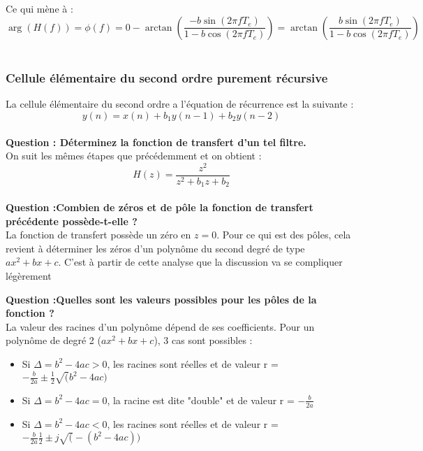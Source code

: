 \documentclass[11pt,a4paper]{article}
\begin{document}
Ce qui mène à :\\

\[ \arg(H(f)) = \phi(f) = 0 - \arctan(\frac{-b \sin(2 \pi f T_e)}{1-b \cos(2 \pi f T_e)}) = \arctan(\frac{b \sin(2 \pi f T_e)}{1-b \cos(2 \pi f T_e)})\]\\

\subsubsection{Cellule élémentaire du second ordre purement récursive}
La cellule élémentaire du second ordre a l'équation de récurrence est la suivante :\\

\[ y(n) =  x(n) + b_1 y(n-1) +b_2 y(n-2)\]\\

\textbf{ Question : Déterminez la fonction de transfert d'un tel filtre.}\\

On suit les mêmes étapes que précédemment et on obtient : \\

\[ H(z)= \frac{z^2}{z^2 + b_1 z + b_2}\]\\

\textbf{Question :Combien de zéros et de pôle la fonction de transfert précédente possède-t-elle ?}\\

La fonction de transfert possède un zéro en $z=0$. Pour ce qui est des pôles, cela revient à déterminer les zéros d'un polynôme du second degré de type $ax^2 + bx + c$. C'est à partir de cette analyse que la discussion va se compliquer légèrement 

\textbf{Question :Quelles sont les valeurs possibles pour les pôles de la fonction ?}\\

La valeur des racines d'un polynôme dépend de ses coefficients. Pour un polynôme de degré 2  ($ax^2 + bx + c$), 3 cas sont possibles :

\begin{itemize}
\item Si $\Delta = b^2 -4ac >0$, les racines sont réelles et de valeur r = $-\frac{b}{2a} \pm \frac{1}{2}\sqrt(b^2 -4ac)$
\item Si $\Delta = b^2 -4ac = 0$, la racine est dite "double" et de valeur r = $-\frac{b}{2a}$
\item Si $\Delta = b^2 -4ac < 0$, les racines sont réelles et de valeur r = $-\frac{b}{2a} \frac{1}{2} \pm j\sqrt(-(b^2 -4ac))$
\end{itemize}
\end{document}
